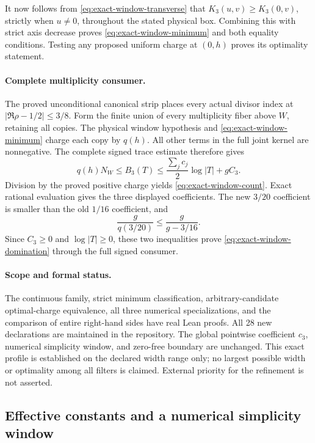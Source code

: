 It now follows from \eqref{eq:exact-window-transverse} that
\(K_3(u,v)\ge K_3(0,v)\), strictly when \(u\ne0\), throughout the
stated physical box.  Combining this with strict axis decrease proves
\eqref{eq:exact-window-minimum} and both equality conditions.  Testing
any proposed uniform charge at \((0,h)\) proves its optimality statement.

\paragraph{Complete multiplicity consumer.}
The proved unconditional canonical strip places every actual divisor
index at \(|\Re\rho-1/2|\le3/8\).  Form the finite union of every
multiplicity fiber above \(W\), retaining all copies.  The physical
window hypothesis and \eqref{eq:exact-window-minimum} charge each copy
by \(q(h)\).  All other terms in the full joint kernel are nonnegative.
The complete signed trace estimate therefore gives
\[
 q(h)N_W\le B_3(T)\le
 \frac{\sum_jc_j}{2}\log|T|+gC_3.
\]
Division by the proved positive charge yields
\eqref{eq:exact-window-count}.  Exact rational evaluation gives the
three displayed coefficients.  The new \(3/20\) coefficient is smaller
than the old \(1/16\) coefficient, and
\[
 \frac{g}{q(3/20)}\le\frac{g}{g-3/16}.
\]
Since \(C_3\ge0\) and \(\log|T|\ge0\), these two inequalities prove
\eqref{eq:exact-window-domination} through the full signed consumer.

\paragraph{Scope and formal status.}
The continuous family, strict minimum classification, arbitrary-candidate
optimal-charge equivalence, all three numerical specializations, and the
comparison of entire right-hand sides have real Lean proofs.  All 28 new
declarations are maintained in the repository.  The global pointwise
coefficient \(c_3\), numerical simplicity window, and zero-free boundary
are unchanged.  This exact profile is established on the declared width
range only; no largest possible width or optimality among all filters
is claimed.  External priority for the refinement is not asserted.

\subsection{Effective constants and a numerical simplicity window}
\label{sec:effective-multiplicity-window}

